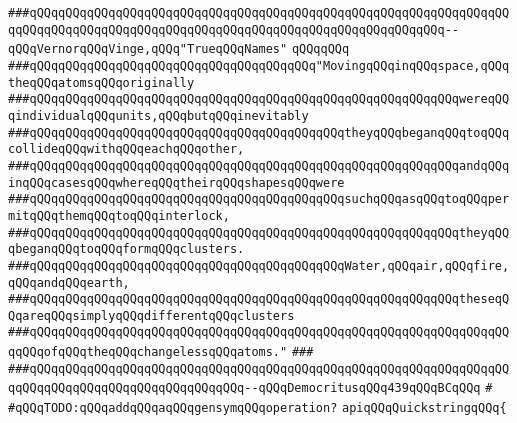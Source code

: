 \verb|###qQQqqQQqqQQqqQQqqQQqqQQqqQQqqQQqqQQqqQQqqQQqqQQqqQQqqQQqqQQqqQQqqQQqqQQqqQQqqQQqqQQqqQQqqQQqqQQqqQQqqQQqqQQqqQQqqQQqqQQqqQQqqQQq--qQQqVernorqQQqVinge,qQQq"TrueqQQqNames"|\newline
\verb|qQQqqQQq|\newline
\newline
\verb|###qQQqqQQqqQQqqQQqqQQqqQQqqQQqqQQqqQQqqQQq"MovingqQQqinqQQqspace,qQQqtheqQQqatomsqQQqoriginally|\newline
\verb|###qQQqqQQqqQQqqQQqqQQqqQQqqQQqqQQqqQQqqQQqqQQqqQQqqQQqqQQqqQQqwereqQQqindividualqQQqunits,qQQqbutqQQqinevitably|\newline
\verb|###qQQqqQQqqQQqqQQqqQQqqQQqqQQqqQQqqQQqqQQqqQQqtheyqQQqbeganqQQqtoqQQqcollideqQQqwithqQQqeachqQQqother,|\newline
\verb|###qQQqqQQqqQQqqQQqqQQqqQQqqQQqqQQqqQQqqQQqqQQqqQQqqQQqqQQqqQQqandqQQqinqQQqcasesqQQqwhereqQQqtheirqQQqshapesqQQqwere|\newline
\verb|###qQQqqQQqqQQqqQQqqQQqqQQqqQQqqQQqqQQqqQQqqQQqsuchqQQqasqQQqtoqQQqpermitqQQqthemqQQqtoqQQqinterlock,|\newline
\verb|###qQQqqQQqqQQqqQQqqQQqqQQqqQQqqQQqqQQqqQQqqQQqqQQqqQQqqQQqqQQqtheyqQQqbeganqQQqtoqQQqformqQQqclusters.|\newline
\verb|###qQQqqQQqqQQqqQQqqQQqqQQqqQQqqQQqqQQqqQQqqQQqWater,qQQqair,qQQqfire,qQQqandqQQqearth,|\newline
\verb|###qQQqqQQqqQQqqQQqqQQqqQQqqQQqqQQqqQQqqQQqqQQqqQQqqQQqqQQqqQQqtheseqQQqareqQQqsimplyqQQqdifferentqQQqclusters|\newline
\verb|###qQQqqQQqqQQqqQQqqQQqqQQqqQQqqQQqqQQqqQQqqQQqqQQqqQQqqQQqqQQqqQQqqQQqqQQqofqQQqtheqQQqchangelessqQQqatoms."|\newline
\verb|###|\newline
\verb|###qQQqqQQqqQQqqQQqqQQqqQQqqQQqqQQqqQQqqQQqqQQqqQQqqQQqqQQqqQQqqQQqqQQqqQQqqQQqqQQqqQQqqQQqqQQqqQQqqQQq--qQQqDemocritusqQQq439qQQqBCqQQq|\newline
\newline
\newline
\newline
\newline
\verb|#|\newline
\verb|#qQQqTODO:qQQqaddqQQqaqQQqgensymqQQqoperation?|\newline
\newline
\newline
\verb|apiqQQqQuickstringqQQq{|\newline
\newline
